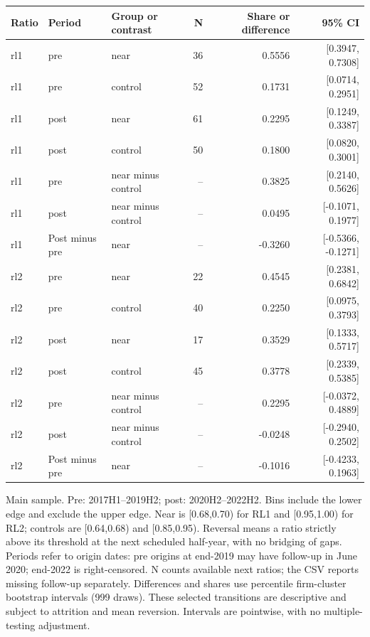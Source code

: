 \begin{threeparttable}
\begin{tabular}{lllrrr}
\toprule
Ratio & Period & Group or contrast & N & Share or difference & 95\% CI \\
\midrule
rl1 & pre & near & 36 & 0.5556 & [0.3947, 0.7308] \\
rl1 & pre & control & 52 & 0.1731 & [0.0714, 0.2951] \\
rl1 & post & near & 61 & 0.2295 & [0.1249, 0.3387] \\
rl1 & post & control & 50 & 0.1800 & [0.0820, 0.3001] \\
rl1 & pre & near minus control & -- & 0.3825 & [0.2140, 0.5626] \\
rl1 & post & near minus control & -- & 0.0495 & [-0.1071, 0.1977] \\
rl1 & Post minus pre & near & -- & -0.3260 & [-0.5366, -0.1271] \\
rl2 & pre & near & 22 & 0.4545 & [0.2381, 0.6842] \\
rl2 & pre & control & 40 & 0.2250 & [0.0975, 0.3793] \\
rl2 & post & near & 17 & 0.3529 & [0.1333, 0.5717] \\
rl2 & post & control & 45 & 0.3778 & [0.2339, 0.5385] \\
rl2 & pre & near minus control & -- & 0.2295 & [-0.0372, 0.4889] \\
rl2 & post & near minus control & -- & -0.0248 & [-0.2940, 0.2502] \\
rl2 & Post minus pre & near & -- & -0.1016 & [-0.4233, 0.1963] \\
\bottomrule
\end{tabular}
\begin{tablenotes}[flushleft]
\footnotesize
\item Main sample. Pre: 2017H1--2019H2; post: 2020H2--2022H2. Bins include the lower edge and exclude the upper edge. Near is [0.68,0.70) for RL1 and [0.95,1.00) for RL2; controls are [0.64,0.68) and [0.85,0.95). Reversal means a ratio strictly above its threshold at the next scheduled half-year, with no bridging of gaps. Periods refer to origin dates: pre origins at end-2019 may have follow-up in June 2020; end-2022 is right-censored. N counts available next ratios; the CSV reports missing follow-up separately. Differences and shares use percentile firm-cluster bootstrap intervals (999 draws). These selected transitions are descriptive and subject to attrition and mean reversion. Intervals are pointwise, with no multiple-testing adjustment.
\end{tablenotes}
\end{threeparttable}
